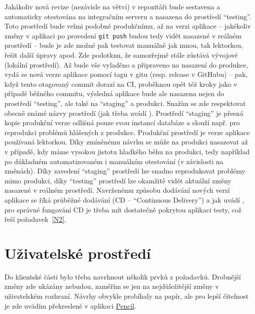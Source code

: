 Jakákoliv nová revize (nezávisle na větvi) v repozitáři bude sestavena a automaticky otestována na integračním serveru a nasazena do prostředí \enquote{testing}. Toto prostředí bude velmi podobné produkčnímu, až na verzi aplikace -- jakékoliv změny v aplikaci po provedení \verb|git push| budou tedy vidět nasazené v reálném prostředí -- bude je zde možné pak testovat manuálně jak mnou, tak lektorkou, řešit další úpravy apod. Zde podotknu, že samozřejmě stále zůstává vývojové (lokální prostředí). Až bude vše vyladěno a připraveno na nasazení do produkce, vydá se nová verze aplikace pomocí tagu v gitu (resp. release v GitHubu) -- pak, když tento otagovaný commit dorazí na CI, proběhnou opět též kroky jako v případě běžného commitu, výsledná aplikace bude ale nasazena nejen do prostředí \enquote{testing}, ale také na \enquote{staging} a produkci. Snažím se zde respektovat obecně známé názvy prostředí (jak třeba uvádí \cite{deployment-beanstalk, deployment-oroinc}). Prostředí \enquote{staging} je přesná kopie produkční verze odlišná pouze svou instancí databáze a slouží např. pro reprodukci problémů hlášených z produkce. Produkční prostředí je verze aplikace používaná lektorkou. Díky zmíněnému návrhu se může na produkci nasazovat až v případě, kdy máme vysokou jistotu hladkého běhu na produkci, tedy například po důkladném automatizovaném i manuálním otestování (v závislosti na změnách). Díky zavedení \enquote{staging} prostředí lze snadno reprodukovat problémy mimo produkci, díky \enquote{testing} prostředí lze okamžitě vidět aktuální změny nasazené v reálném prostředí. Navrženému způsobu dodávání nových verzí aplikace se říká průběžné dodávání (CD -- \enquote{Continuous Delivery}) \cite{deployment-atlassian} a jak uvádí \cite{deployment-atlassian}, pro správné fungování CD je třeba mít dostatečně pokrytou aplikaci testy, což řeší požadavek~\ref{N2}.

\section{Uživatelské prostředí}\label{sec:uzivatelskeprostredi}

Do klientské části bylo třeba navrhnout několik prvků z požadavků. Drobnější změny zde ukázány nebudou, zaměřím se jen na nejdůležitější změny v uživatelském rozhraní. Návrhy obvykle probíhaly na papír, ale pro lepší čitelnost je zde uvádím překreslené v aplikaci \href{https://pencil.evolus.vn/}{Pencil}.

